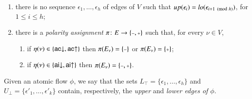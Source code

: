 \begin{definition}
\begin{enumerate}
\item\label{ItAcycl} there is no sequence $\epsilon_1,\dots,\epsilon_h$ of edges of $V$ such that ${\mathit up}(\epsilon_i)={\mathit lo}(\epsilon_{i+1\pmod h})$, for $1\le i\le h$;
\item\label{definition:AtomicFlow:item:PolarityAssignment} there is a \emph{polarity assignment} $\pi\colon E\to\{\pmi,\ppl\}$ such that, for every $\nu\in V$,
\begin{enumerate}
\item if $\eta(\nu)\in\{\mathsf{ac}{\downarrow},\mathsf{ac}{\uparrow}\}$ then $\pi(E_\nu)=\{\pmi\}$ or $\pi(E_\nu)=\{\ppl\}$;
\item if $\eta(\nu)\in\{\mathsf{ai}{\downarrow},\mathsf{ai}{\uparrow}\}$ then $\pi(E_\nu)=\{\pmi,\ppl\}$.
\end{enumerate}
\end{enumerate}
Given an atomic flow $\phi$, we say that the sets $L_\top=\{\epsilon_1,\dots,\epsilon_h\}$ and $U_\bot=\{\epsilon'_1,\dots,\epsilon'_k\}$ contain, respectively, the \emph{upper} and \emph{lower edges of $\phi$}.
\end{definition}


